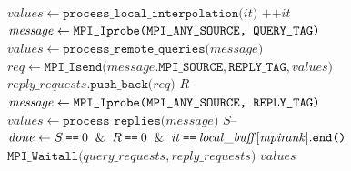 \begin{algorithm}[htbp]
\begin{algorithmic}[1]
		\State $\mathit{values} \gets \texttt{process\_local\_interpolation(}it\texttt{)}$ 
		\State $\texttt{++}\mathit{it}$
	\EndIf
	 
		\State $\mathit{message} \gets \texttt{MPI\_Iprobe(\texttt{MPI\_ANY\_SOURCE}, \texttt{QUERY\_TAG})}$
			\State $\mathit{values} \gets \texttt{process\_remote\_queries(}\mathit{message}\texttt{)}$ 
			\State $req \gets \texttt{MPI\_Isend(}\mathit{message}.\texttt{MPI\_SOURCE}, \texttt{REPLY\_TAG}, \mathit{values}\texttt{)}$ 
			\State $\textit{reply\_requests}.\texttt{push\_back(}req\texttt{)}$
			\State $R\texttt{--}$
		\EndIf
	\EndIf
	 
		\State $\mathit{message} \gets \texttt{MPI\_Iprobe(\texttt{MPI\_ANY\_SOURCE}, \texttt{REPLY\_TAG})}$
			\State $\mathit{values} \gets \texttt{process\_replies(}\mathit{message}\texttt{)}$ 
			\State $S\texttt{--}$
		\EndIf
	\EndIf
	\State $\mathit{done} \gets S \deq 0 \And R \deq 0 \And \mathit{it \deq local\_buff[mpirank]}.\texttt{end()}$
\EndWhile
\State $\texttt{MPI\_Waitall(}query\_requests, reply\_requests\texttt{)}$ 
\State \Return $\mathit{values}$
\end{algorithmic}
\label{alg:interpolation}
\end{algorithm}


